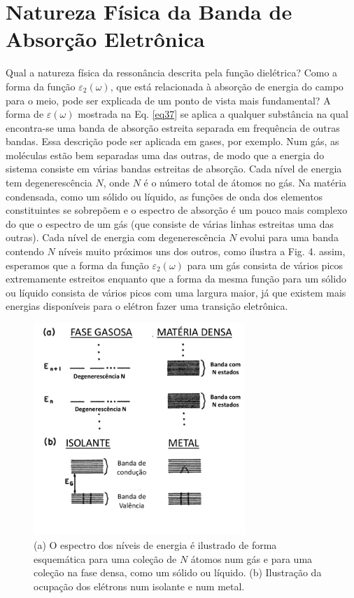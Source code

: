 \documentclass{article}
\begin{document}
\section{Natureza Física da Banda de Absorção Eletrônica}

Qual a natureza física da ressonância descrita pela função dielétrica? Como a forma da função $\varepsilon_2 (\omega)$, que está relacionada à absorção de energia do campo para o meio, pode ser explicada de um ponto de vista mais fundamental? A forma de $\varepsilon(\omega)$ mostrada na Eq. \eqref{eq37} se aplica a qualquer substância na qual encontra-se uma banda de absorção estreita separada em frequência de outras bandas. Essa descrição pode ser aplicada em gases, por exemplo. Num gás, as moléculas estão bem separadas uma das outras, de modo que a energia do sistema consiste em várias bandas estreitas de absorção. Cada nível de energia tem degenerescência $N$, onde $N$ é o número total de átomos no gás. Na matéria condensada, como um sólido ou líquido, as funções de onda dos elementos constituintes se sobrepõem e o espectro de absorção é um pouco mais complexo do que o espectro de um gás (que consiste de várias linhas estreitas uma das outras). Cada nível de energia com degenerescência $N$ evolui para uma banda contendo $N$ níveis muito próximos uns dos outros, como ilustra a Fig. 4. assim, esperamos que a forma da função $\varepsilon_2 (\omega)$ para um gás consista de vários picos extremamente estreitos enquanto que a forma da mesma função para um sólido ou líquido consista de vários picos com uma largura maior, já que existem mais energias disponíveis para o elétron fazer uma transição eletrônica.

\begin{figure}[ht]
\centering
\includegraphics[width=8cm]{fig4.pdf}
\caption{(a) O espectro dos níveis de energia é ilustrado de forma esquemática para uma coleção de $N$ átomos num gás e para uma coleção na fase densa, como um sólido ou líquido. (b) Ilustração da ocupação dos elétrons num isolante e num metal.}
\end{figure}
\end{document}
